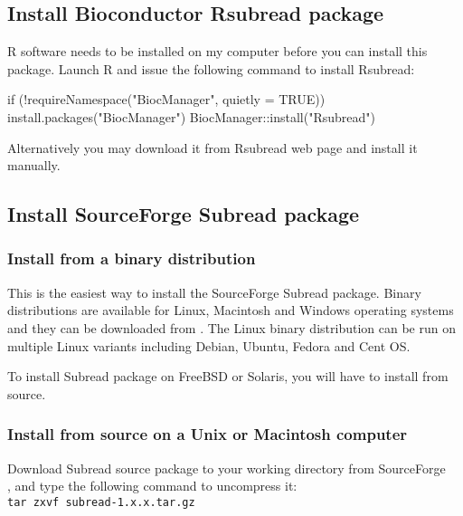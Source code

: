 \documentclass[12pt]{report}
\newcommand{\code}[1]{{\small\texttt{#1}}}
\newcommand{\Subread}{\textsf{Subread}}
\newcommand{\Rsubread}{\textsf{Rsubread}}
\newcommand{\R}{\textsf{R}}
\begin{document}
\subsection{Install Bioconductor {\Rsubread} package}

{\R} software needs to be installed on my computer before you can install this package.
Launch {\R} and issue the following command to install {\Rsubread}:

\begin{Rcode}
if (!requireNamespace("BiocManager", quietly = TRUE))
    install.packages("BiocManager")
BiocManager::install("Rsubread")
\end{Rcode}

Alternatively you may download it from {\Rsubread} web page {} and install it manually.

\subsection{Install SourceForge {\Subread} package}

\subsubsection{Install from a binary distribution}

This is the easiest way to install the SourceForge {\Subread} package.
Binary distributions are available for Linux, Macintosh and Windows operating systems and they can be downloaded from {}.
The Linux binary distribution can be run on multiple Linux variants including Debian, Ubuntu, Fedora and Cent OS.

To install {\Subread} package on FreeBSD or Solaris, you will have to install from source.

\subsubsection{Install from source on a Unix or Macintosh computer}

Download {\Subread} source package to your working directory from SourceForge \\
{}, and type the following command to uncompress it:\\

\code{tar zxvf subread-1.x.x.tar.gz}\\
\end{document}
